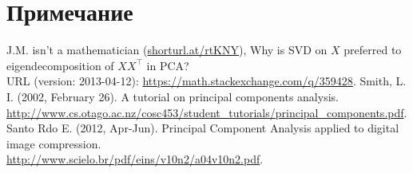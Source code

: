 \documentclass[a4paper]{article}
\begin{document}
\section*{Примечание}
\begin{thebibliography}{9}
J.M. isn't a mathematician (\url{shorturl.at/rtKNY}), Why is SVD on $X$ preferred to eigendecomposition of $XX^\top$ in PCA?\\URL (version: 2013-04-12): \url{https://math.stackexchange.com/q/359428}.
Smith, L. I. (2002, February 26). A tutorial on principal components analysis.\\
\url{http://www.cs.otago.ac.nz/cosc453/student_tutorials/principal_components.pdf}.
Santo Rdo E. (2012,  Apr-Jun). Principal Component Analysis applied to digital image compression.\\
\url{http://www.scielo.br/pdf/eins/v10n2/a04v10n2.pdf}.
\end{thebibliography}
\end{document}
